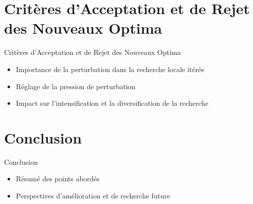 \documentclass[11pt]{beamer}
\begin{document}
\section{Critères d'Acceptation et de Rejet des Nouveaux Optima}
\begin{frame}{Critères d'Acceptation et de Rejet des Nouveaux Optima}
    \begin{itemize}
        \item Importance de la perturbation dans la recherche locale itérée
        \item Réglage de la pression de perturbation
        \item Impact sur l'intensification et la diversification de la recherche
    \end{itemize}
\end{frame}

\section{Conclusion}
\begin{frame}{Conclusion}
    \begin{itemize}
        \item Résumé des points abordés
        \item Perspectives d'amélioration et de recherche future
    \end{itemize}
\end{frame}

\end{document}
